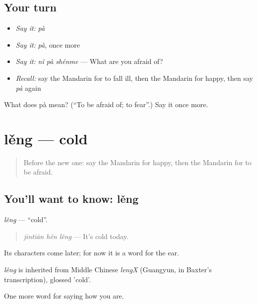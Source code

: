 \subsection*{Your turn}
\begin{itemize}
\raggedright
  \item \emph{Say it:} \emph{pà}
  \item \emph{Say it:} \emph{pà}, once more
  \item \emph{Say it:} \emph{nǐ pà shénme} — What are you afraid of?
  \item \emph{Recall:} say the Mandarin for to fall ill, then the Mandarin for happy, then say \emph{pà} again
\end{itemize}

\begin{tcolorbox}[breakable,colback=teal!4,colframe=teal!35!black,title={Before you move on}]
What does pà mean? (\textquotedblleft{}To be afraid of; to fear\textquotedblright{}.) Say it once more.
\end{tcolorbox}
\section[lěng]{lěng — cold}

\label{lesson:ZH-C51-leng}



\begin{quote}
Before the new one: say the Mandarin for happy, then the Mandarin for to be afraid.
\end{quote}

\subsection*{You'll want to know: lěng}
\emph{lěng} — \textquotedblleft{}cold\textquotedblright{}.

\begin{quote}
\emph{jīntiān hěn lěng} — It's cold today.
\end{quote}

Its characters come later; for now it is a word for the ear.

\begin{cousinweb}
\emph{lěng} is inherited from Middle Chinese \emph{lengX} (Guangyun, in Baxter's transcription), glossed 'cold'.
\end{cousinweb}

\begin{grammarlens}[title={What you've built}]
One more word for saying how you are.
\end{grammarlens}

